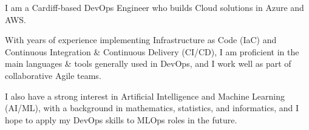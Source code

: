 
\begin{small}

  \vspace{0.25cm}

  I am a Cardiff-based DevOps Engineer who builds Cloud solutions in Azure and AWS.
  \vspace{0.25cm}

  With years of experience implementing Infrastructure as Code (IaC) and Continuous Integration \& Continuous Delivery (CI/CD),
  I am proficient in the main languages \& tools generally used in DevOps,
  and I work well as part of collaborative Agile teams.
  \vspace{0.25cm}

  I also have a strong interest in Artificial Intelligence and Machine Learning (AI/ML),
  with a background in mathematics, statistics, and informatics,
  and I hope to apply my DevOps skills to MLOps roles in the future.

\end{small}
